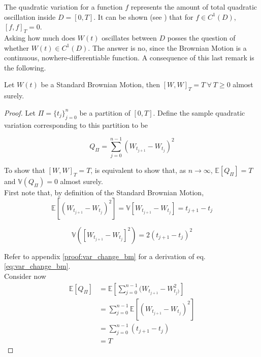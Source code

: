 \documentclass[../TGMAFFIRO]{subfiles}
\begin{document}
The quadratic variation for a function $f$ represents the amount of total quadratic oscillation inside $D = [0,T]$. It can be shown (see ) that for $f \in C^1(D)$, $[f,f]_T = 0$.\\
	
Asking how much does $W(t)$ oscillates between $D$ posses the question of whether $W(t) \in C^1(D)$. The answer is no, since the Brownian Motion is a continuous, nowhere-differentiable function. A consequence of this last remark is the following.

\begin{theorem}\label{th:quadratic_brownian_motion}
	Let $W(t)$ be a Standard Brownian Motion, then $[W, W]_T = T \ \forall \ T \geq 0$ almost surely.
\end{theorem}

\begin{proof}
	Let $\Pi = \{t_j\}_{j=0}^n$ be a partition of $[0, T]$. Define the sample quadratic variation corresponding to this partition to be
	
	\[
		Q_{\Pi} = \sum_{j=0}^{n-1}(W_{t_{j+1}} - W_{t_{j}})^2
	\]
	
	To show that $[W, W]_T = T$, is equivalent to show that, as $n\to\infty$, $\mathbb{E}[Q_\Pi] = T$ and $\mathbb{V}(Q_\Pi) = 0$ almost surely.\\
	
	First note that, by definition of the Standard Brownian Motion,
	\begin{equation}\label{eq:exp_change_bm}
		\mathbb{E}[(W_{t_{j+1}} - W_{t_{j}})^2] = \mathbb{V}[W_{t_{j+1}} - W_{t_{j}}] = t_{j+1} - t_{j}
	\end{equation}
	
	\begin{equation}\label{eq:var_change_bm}
		\mathbb{V}([W_{t_{j+1}} - W_{t_{j}}]^2) = 2(t_{j+1} - t_{j})^2
	\end{equation}
	
	Refer to appendix \ref{proof:var_change_bm} for a derivation of eq. \ref{eq:var_change_bm}.\\
	
	Consider now
	\begin{align*}
		\mathbb{E}[Q_\Pi] &= \mathbb{E}[\sum_{j=0}^{n-1}(W_{t_{j+1}} - W_{t_{j})}^2] \\
		&= \sum_{j=0}^{n-1}\mathbb{E}[(W_{t_{j+1}} - W_{t_{j}})^2] \\
		&= \sum_{j=0}^{n-1}(t_{j+1} - t_{j}) \\
		&= T
	\end{align*}
	

\end{proof}
\end{document}
